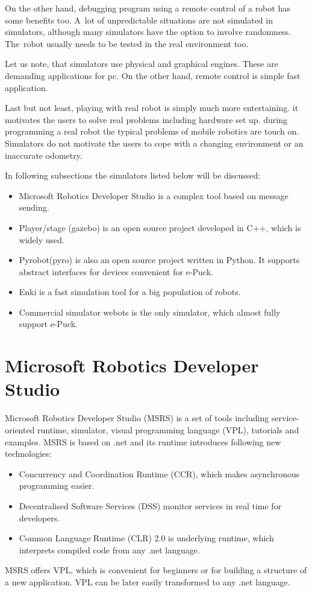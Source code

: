   On the other hand, debugging program using a remote control of a robot has some benefits too. 
  A~lot of unpredictable situations are not simulated in simulators, although 
  many simulators have the option to involve randomness. The~robot usually
  needs to be tested in the real environment too.
  
  Let us note, that simulators use physical and graphical engines. 
  These are demanding applications for pc. 
  On the other hand, remote control is simple fast application.
  
  Last but not least, playing with real robot is simply much more entertaining. 	
  it motivates the users to solve real problems including hardware set up. 
  during programming a real robot the typical problems of mobile robotics are touch on.
  Simulators do not motivate the users to cope with a changing environment or an inaccurate odometry.
  
  In following subsections the simulators listed below will be discussed:
  \begin{itemize}
  \item Microsoft Robotics Developer Studio\cite{msrs} is a complex tool based on message sending.
  \item Player/stage\cite{player} (gazebo) is an open source project developed in C++, which is widely used.
  \item Pyrobot(pyro)\cite{pyro} is also an open source project written in Python. It supports abstract
  interfaces for devices convenient for e-Puck.
  \item Enki\cite{enki} is a fast simulation tool for a big population of robots.
  \item Commercial simulator webots\cite{webots} is the only simulator, which almost fully support e-Puck. 
  \end{itemize}
\section{Microsoft Robotics Developer Studio\cite{msrs}} 
  Microsoft Robotics Developer Studio (MSRS) is a set of tools including service-oriented runtime,
  simulator, visual programming language (VPL),
  tutorials and examples. MSRS is based on .net and its runtime introduces following new technologies:
  \begin{itemize}
  \item Concurrency and Coordination Runtime (CCR), which makes asynchronous programming easier.
  \item Decentralised Software Services (DSS) monitor services in real time for developers.
  \item Common Language Runtime (CLR) 2.0 is underlying runtime, 
          which interprets compiled code from any .net language.
  \end{itemize}	
  MSRS offers VPL, which is convenient for beginners or for building a structure of a new application.
  VPL can be later easily transformed to any .net language.
  
